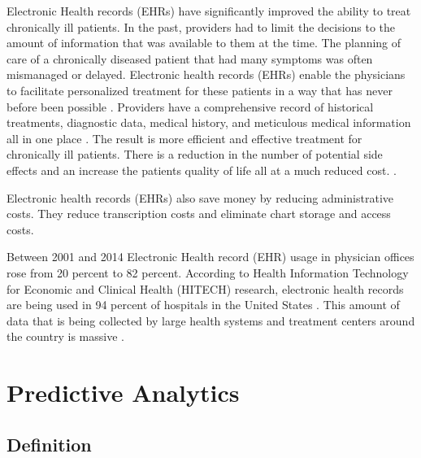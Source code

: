 \documentclass[sigconf]{acmart}
\begin{document}
Electronic Health records (EHRs) have significantly improved the ability to treat chronically ill patients.  In the past, providers had to limit the decisions to the amount of information that was available to them at the time. The planning of care of a chronically diseased patient that had many symptoms was often mismanaged or delayed.  Electronic health records (EHRs) enable the physicians to facilitate personalized treatment for these patients in a way that has never before been possible \cite{www-google-christian}. Providers have a comprehensive record of historical treatments, diagnostic data, medical history, and meticulous medical information all in one place \cite{www-google-christian}. The result is more efficient and effective treatment for chronically ill patients. There is a reduction in the number of potential side effects and an increase the patients quality of life all at a much reduced cost. \cite{www-google-christian}.  

Electronic health records (EHRs) also save money by reducing administrative costs. They reduce transcription costs and eliminate chart storage and access costs.

Between 2001 and 2014 Electronic Health record (EHR) usage in physician offices rose from 20 percent to 82 percent.  According to Health Information Technology for Economic and Clinical Health (HITECH) research, electronic health records are being used in 94 percent of hospitals in the United States \cite{www-google-datapine}.  This amount of data that is being collected by large health systems and treatment centers around the country is massive \cite{www-google-pred}. 

\section{Predictive Analytics}

\subsection{Definition}
\end{document}
